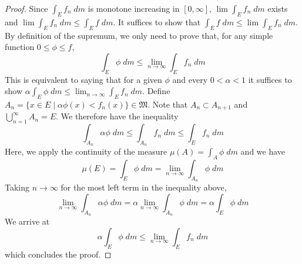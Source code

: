 \vspace{2ex}
\begin{proof}
Since $\int _{E}f_{n}\;d m$ is monotone increasing in $[0,\infty ]$, $\lim \int _{E}f_{n}\;d m$ exists and $\lim \int _{E}f_{n}\;d m\leq \int _{E}f\;d m$. It suffices to show that $\int _{E}f\;d m\leq \lim \int _{E}f_{n}\;d m$. By definition of the supremum, we only need to prove that, for any simple function $0\leq \phi \leq f$,
\[\int _{E}\phi \;d m\leq \lim_{n\rightarrow \infty } \int _{E}f_{n}\;d m\]
This is equivalent to saying that for a given $\phi $ and every $0<\alpha <1$ it suffices to show $\alpha \int _{E}\phi\;d m\leq \lim _{n\rightarrow \infty }\int _{E}f_{n}\;d m$. Define $A_{n}=\{x\in E \;|\; \alpha \phi (x)<f_{n}(x)\}\in \mathfrak{M}$. Note that $A_{n}\subset A_{n+1}$ and $\bigcup _{n=1}^{\infty }A_{n}=E$. We therefore have the inequality
\[\int _{A_{n}}\alpha \phi \;d m\leq \int _{A_{n}}f_{n}\;d m\leq \int _{E}f_{n}\;d m\]
Here, we apply the continuity of the measure $\mu (A)=\int _{A}\phi \;d m$ and we have
\[\mu (E)=\int _{E}\phi \;d m=\lim _{n\rightarrow \infty }\int _{A_{n}}\phi \;d m\]
Taking $n\rightarrow \infty $ for the most left term in the inequality above,
\[\lim _{n\rightarrow \infty }\int _{A_{n}}\alpha \phi \;d m=\alpha \lim _{n\rightarrow \infty }\int _{A_{n}}\phi \;d m=\alpha \int _{E}\phi \;d m\]
We arrive at 
\[\alpha \int _{E}\phi \;d m\leq \lim_{n\rightarrow \infty } \int _{E}f_{n}\;d m\]
which concludes the proof.
\end{proof}
\vspace{2ex}

